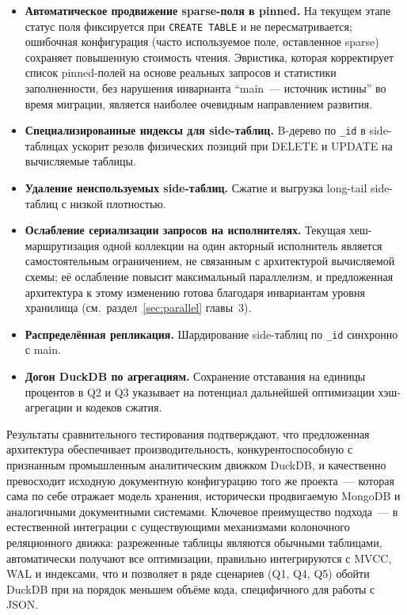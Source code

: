 \begin{itemize}
    \item \textbf{Автоматическое продвижение sparse-поля в pinned.}
    На текущем этапе статус поля фиксируется при
    \texttt{CREATE TABLE} и не пересматривается; ошибочная
    конфигурация (часто используемое поле, оставленное sparse)
    сохраняет повышенную стоимость чтения. Эвристика, которая
    корректирует список pinned-полей на основе реальных запросов и
    статистики заполненности, без нарушения инварианта
    ``main~--- источник истины'' во время миграции, является
    наиболее очевидным направлением развития.
    \item \textbf{Специализированные индексы для side-таблиц.}
    B-дерево по \texttt{\_id} в side-таблицах ускорит резолв
    физических позиций при DELETE и UPDATE на вычисляемые таблицы.
    \item \textbf{Удаление неиспользуемых side-таблиц.} Сжатие и
    выгрузка long-tail side-таблиц с низкой плотностью.
    \item \textbf{Ослабление сериализации запросов на исполнителях.}
    Текущая хеш-маршрутизация одной коллекции на один акторный
    исполнитель является самостоятельным ограничением, не
    связанным с архитектурой вычисляемой схемы; её ослабление
    повысит максимальный параллелизм, и предложенная архитектура к
    этому изменению готова благодаря инвариантам уровня хранилища
    (см.~раздел~\ref{sec:parallel} главы~3).
    \item \textbf{Распределённая репликация.} Шардирование
    side-таблиц по \texttt{\_id} синхронно с main.
    \item \textbf{Догон DuckDB по агрегациям.} Сохранение
    отставания на единицы процентов в Q2 и Q3 указывает на
    потенциал дальнейшей оптимизации хэш-агрегации и кодеков
    сжатия.
\end{itemize}

\chapterconclusion

Результаты сравнительного тестирования подтверждают, что
предложенная архитектура обеспечивает производительность,
конкурентоспособную с признанным промышленным аналитическим
движком DuckDB, и качественно превосходит исходную документную
конфигурацию того же проекта~--- которая сама по себе отражает
модель хранения, исторически продвигаемую MongoDB и аналогичными
документными системами. Ключевое преимущество подхода~--- в
естественной интеграции с существующими механизмами колоночного
реляционного движка: разреженные таблицы являются обычными
таблицами, автоматически получают все оптимизации, правильно
интегрируются с MVCC, WAL и индексами, что и позволяет в ряде
сценариев (Q1, Q4, Q5) обойти DuckDB при на порядок меньшем объёме
кода, специфичного для работы с JSON.
